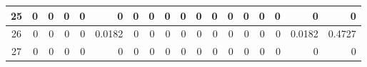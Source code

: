 \begin{table}[ht]
\begin{adjustbox}{width = \textwidth, center}
\begin{tabular}{|c|r|r|r|r|r|r|r|r|r|r|r|r|r|r|r|r|r|}
            \rowcolor[HTML]{FFFFFF} 
            \cellcolor[HTML]{CFE2F3}25                           & 0                                              & 0                                              & 0                                              & 0                                              & 0                                              & 0                                              & 0                                              & 0                                               & 0                                               & 0                                               & 0                                               & 0                                               & 0                                               & 0                                               & 0                                               & \cellcolor[HTML]{D9D2E9}0                                                             & \cellcolor[HTML]{D9D2E9}0                                                                 \\ \hline
            \rowcolor[HTML]{FFFFFF} 
            \cellcolor[HTML]{CFE2F3}26                           & 0                                              & 0                                              & 0                                              & 0                                              & \cellcolor[HTML]{C7E9D8}0.0182                 & 0                                              & 0                                              & 0                                               & 0                                               & 0                                               & 0                                               & 0                                               & 0                                               & 0                                               & 0                                               & \cellcolor[HTML]{D9D2E9}0.0182                                                        & \cellcolor[HTML]{D9D2E9}0.4727                                                            \\ \hline
            \rowcolor[HTML]{FFFFFF} 
            \cellcolor[HTML]{CFE2F3}27                           & 0                                              & 0                                              & 0                                              & 0                                              & 0                                              & 0                                              & 0                                              & 0                                               & 0                                               & 0                                               & 0                                               & 0                                               & 0                                               & 0                                               & 0                                               & \cellcolor[HTML]{D9D2E9}0                                                             & \cellcolor[HTML]{D9D2E9}0                                                                 \\ \hline

\end{tabular}
\end{adjustbox}
\end{table}

